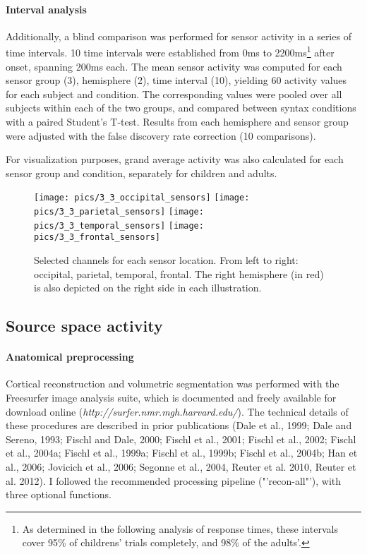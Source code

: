 \paragraph{Interval analysis}
Additionally, a blind comparison was performed for sensor activity in a series of time intervals.
10 time intervals were established from 0ms to 2200ms\footnote{As determined in the following analysis of response times, these intervals cover 95\% of childrens' trials completely, and 98\% of the adults'.} after onset, spanning 200ms each.
The mean sensor activity was computed for each sensor group (3), hemisphere (2), time interval (10), yielding 60 activity values for each subject and condition.
The corresponding values were pooled over all subjects within each of the two groups, and compared between syntax conditions with a paired Student's T-test.
Results from each hemisphere and sensor group were adjusted with the false discovery rate correction (10 comparisons).

For visualization purposes, grand average activity was also calculated for each sensor group and condition, separately for children and adults.

\begin{figure}[h]
\begin{center}
\vspace{7mm}
\texttt{[image: pics/3\_3\_occipital\_sensors]}
\texttt{[image: pics/3\_3\_parietal\_sensors]}
\texttt{[image: pics/3\_3\_temporal\_sensors]}
\texttt{[image: pics/3\_3\_frontal\_sensors]}
\caption{\label{3.3.sensors} Selected channels for each sensor location. From left to right: occipital, parietal, temporal, frontal. The right hemisphere (in red) is also depicted on the right side in each illustration.}
\end{center}
\end{figure}

\subsection{Source space activity}

\paragraph{Anatomical preprocessing}
Cortical reconstruction and volumetric segmentation was performed with the Freesurfer image analysis suite, which is documented and freely available for download online (\emph{http://surfer.nmr.mgh.harvard.edu/}).
The technical details of these procedures are described in prior publications (Dale et al., 1999; Dale and Sereno, 1993; Fischl and Dale, 2000; Fischl et al., 2001; Fischl et al., 2002; Fischl et al., 2004a; Fischl et al., 1999a; Fischl et al., 1999b; Fischl et al., 2004b; Han et al., 2006; Jovicich et al., 2006; Segonne et al., 2004, Reuter et al. 2010, Reuter et al. 2012).
I followed the recommended processing pipeline ("'recon-all"'), with three optional functions.

